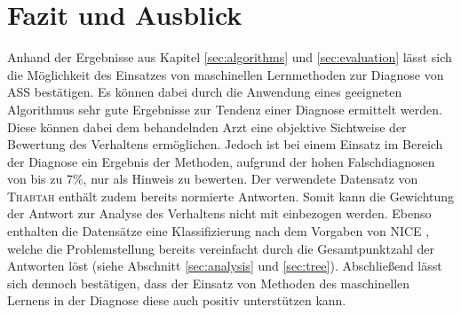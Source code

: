 \section{Fazit und Ausblick}
Anhand der Ergebnisse aus Kapitel \ref{sec:algorithms} und \ref{sec:evaluation} lässt sich die Möglichkeit des Einsatzes von maschinellen Lernmethoden zur Diagnose von ASS bestätigen. Es können dabei durch die Anwendung eines geeigneten Algorithmus sehr gute Ergebnisse zur Tendenz einer Diagnose ermittelt werden. Diese können dabei dem behandelnden Arzt eine objektive Sichtweise der Bewertung des Verhaltens ermöglichen. Jedoch ist bei einem Einsatz im Bereich der Diagnose ein Ergebnis der Methoden, aufgrund der hohen Falschdiagnosen von bis zu 7\%, nur als Hinweis zu bewerten. 
Der verwendete Datensatz von \textsc{Thabtah} \cite{Thabtah2017, Thabtah, Thabtah2018} enthält zudem bereits normierte Antworten. Somit kann die Gewichtung der Antwort zur Analyse des Verhaltens nicht mit einbezogen werden. Ebenso enthalten die Datensätze eine Klassifizierung nach dem Vorgaben von \textsc{NICE} \cite{NICE2012}, welche die Problemstellung bereits vereinfacht durch die Gesamtpunktzahl der Antworten löst (siehe Abschnitt \ref{sec:analysis} und \ref{sec:tree}). Abschließend lässt sich dennoch bestätigen, dass der Einsatz von Methoden des maschinellen Lernens in der Diagnose diese auch positiv unterstützen kann.
